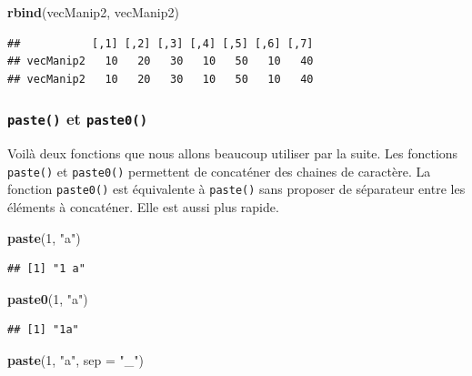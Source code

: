 \documentclass[]{book}
\newenvironment{Shaded}{\begin{snugshade}}{\end{snugshade}}
\newcommand{\DataTypeTok}[1]{\textcolor[rgb]{0.13,0.29,0.53}{#1}}
\newcommand{\DecValTok}[1]{\textcolor[rgb]{0.00,0.00,0.81}{#1}}
\newcommand{\KeywordTok}[1]{\textcolor[rgb]{0.13,0.29,0.53}{\textbf{#1}}}
\newcommand{\NormalTok}[1]{#1}
\newcommand{\StringTok}[1]{\textcolor[rgb]{0.31,0.60,0.02}{#1}}
\begin{document}
\begin{Shaded}
\begin{Highlighting}[]
\KeywordTok{rbind}\NormalTok{(vecManip2, vecManip2)}
\end{Highlighting}
\end{Shaded}

\begin{verbatim}
##           [,1] [,2] [,3] [,4] [,5] [,6] [,7]
## vecManip2   10   20   30   10   50   10   40
## vecManip2   10   20   30   10   50   10   40
\end{verbatim}

\hypertarget{l015paste}{%
\subsubsection{\texorpdfstring{\texttt{paste()} et \texttt{paste0()}}{paste() et paste0()}}\label{l015paste}}

Voilà deux fonctions que nous allons beaucoup utiliser par la suite. Les fonctions \texttt{paste()} et \texttt{paste0()} permettent de concaténer des chaines de caractère. La fonction \texttt{paste0()} est équivalente à \texttt{paste()} sans proposer de séparateur entre les éléments à concaténer. Elle est aussi plus rapide.

\begin{Shaded}
\begin{Highlighting}[]
\KeywordTok{paste}\NormalTok{(}\DecValTok{1}\NormalTok{, }\StringTok{"a"}\NormalTok{)}
\end{Highlighting}
\end{Shaded}

\begin{verbatim}
## [1] "1 a"
\end{verbatim}

\begin{Shaded}
\begin{Highlighting}[]
\KeywordTok{paste0}\NormalTok{(}\DecValTok{1}\NormalTok{, }\StringTok{"a"}\NormalTok{)}
\end{Highlighting}
\end{Shaded}

\begin{verbatim}
## [1] "1a"
\end{verbatim}

\begin{Shaded}
\begin{Highlighting}[]
\KeywordTok{paste}\NormalTok{(}\DecValTok{1}\NormalTok{, }\StringTok{"a"}\NormalTok{, }\DataTypeTok{sep =} \StringTok{"_"}\NormalTok{)}
\end{Highlighting}
\end{Shaded}
\end{document}
